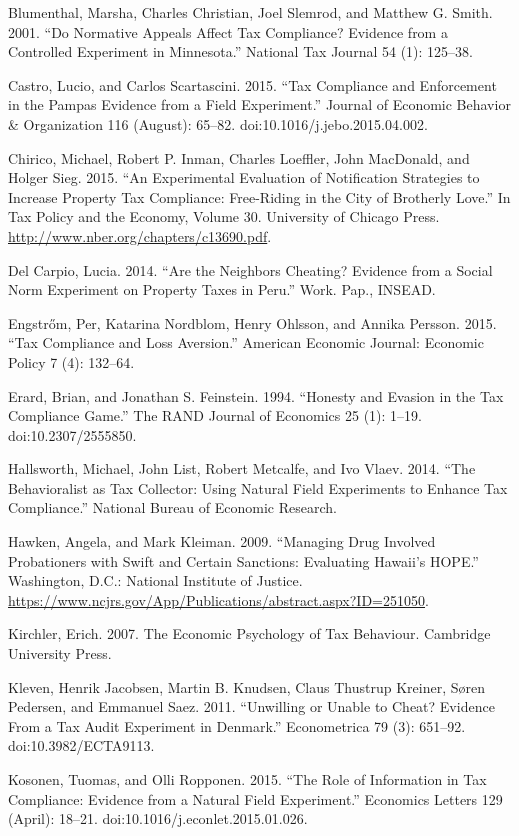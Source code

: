 \documentclass[12pt,titlepage]{article}
\begin{document}
Blumenthal, Marsha, Charles Christian, Joel Slemrod, and Matthew G. Smith. 2001. “Do Normative Appeals Affect Tax Compliance? Evidence from a Controlled Experiment in Minnesota.” National Tax Journal 54 (1): 125–38.

Castro, Lucio, and Carlos Scartascini. 2015. “Tax Compliance and Enforcement in the Pampas Evidence from a Field Experiment.” Journal of Economic Behavior \& Organization 116 (August): 65–82. doi:10.1016/j.jebo.2015.04.002.

Chirico, Michael, Robert P. Inman, Charles Loeffler, John MacDonald, and Holger Sieg. 2015. “An Experimental Evaluation of Notification Strategies to Increase Property Tax Compliance: Free-Riding in the City of Brotherly Love.” In Tax Policy and the Economy, Volume 30. University of Chicago Press. \url{http://www.nber.org/chapters/c13690.pdf}.

Del Carpio, Lucia. 2014. “Are the Neighbors Cheating? Evidence from a Social Norm Experiment on Property Taxes in Peru.” Work. Pap., INSEAD.

Engstr{\H o}m, Per, Katarina Nordblom, Henry Ohlsson, and Annika Persson. 2015. “Tax Compliance and Loss Aversion.” American Economic Journal: Economic Policy 7 (4): 132–64.

Erard, Brian, and Jonathan S. Feinstein. 1994. “Honesty and Evasion in the Tax Compliance Game.” The RAND Journal of Economics 25 (1): 1–19. doi:10.2307/2555850.

Hallsworth, Michael, John List, Robert Metcalfe, and Ivo Vlaev. 2014. “The Behavioralist as Tax Collector: Using Natural Field Experiments to Enhance Tax Compliance.” National Bureau of Economic Research.

Hawken, Angela, and Mark Kleiman. 2009. “Managing Drug Involved Probationers with Swift and Certain Sanctions: Evaluating Hawaii’s HOPE.” Washington, D.C.: National Institute of Justice. \url{https://www.ncjrs.gov/App/Publications/abstract.aspx?ID=251050}.

Kirchler, Erich. 2007. The Economic Psychology of Tax Behaviour. Cambridge University Press.

Kleven, Henrik Jacobsen, Martin B. Knudsen, Claus Thustrup Kreiner, Søren Pedersen, and Emmanuel Saez. 2011. “Unwilling or Unable to Cheat? Evidence From a Tax Audit Experiment in Denmark.” Econometrica 79 (3): 651–92. doi:10.3982/ECTA9113.

Kosonen, Tuomas, and Olli Ropponen. 2015. “The Role of Information in Tax Compliance: Evidence from a Natural Field Experiment.” Economics Letters 129 (April): 18–21. doi:10.1016/j.econlet.2015.01.026.
\end{document}
